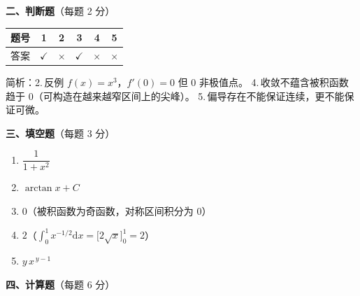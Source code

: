 \documentclass[12pt]{ctexart}
\theoremstyle{definition}
\begin{document}
\vspace{10pt}
\noindent\textbf{二、判断题}（每题 2 分）\par\vspace{4pt}
\begin{center}
\renewcommand{\arraystretch}{1.3}
\begin{tabular}{|c|c|c|c|c|c|}
\hline
题号 & 1 & 2 & 3 & 4 & 5 \\\hline
答案 & $\checkmark$ & $\times$ & $\checkmark$ & $\times$ & $\times$ \\\hline
\end{tabular}
\end{center}
\noindent\small 简析：2.\,反例 $f(x)=x^{3}$，$f'(0)=0$ 但 $0$ 非极值点。
4.\,收敛不蕴含被积函数趋于 $0$（可构造在越来越窄区间上的尖峰）。
5.\,偏导存在不能保证连续，更不能保证可微。\normalsize

\vspace{10pt}
\noindent\textbf{三、填空题}（每题 3 分）\par\vspace{4pt}
\begin{enumerate}[label=\arabic*.,itemsep=4pt]
\item $\dfrac{1}{1+x^{2}}$ \qquad
\item $\arctan x+C$ \qquad
\item $0$（被积函数为奇函数，对称区间积分为 $0$）
\item $2$\qquad（$\int_{0}^{1}x^{-1/2}\mathrm{d}x=\big[2\sqrt{x}\big]_{0}^{1}=2$）
\item $y\,x^{\,y-1}$
\end{enumerate}

\vspace{6pt}
\noindent\textbf{四、计算题}（每题 6 分）
\end{document}
